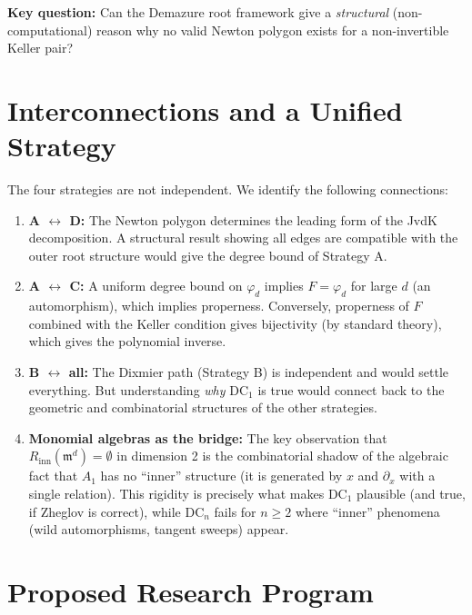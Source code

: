 \documentclass[12pt,a4paper]{article}
\theoremstyle{definition}
\newcommand{\pp}{\mathfrak{m}}
\begin{document}
\textbf{Key question:} Can the Demazure root framework give a \emph{structural}
(non-computational) reason why no valid Newton polygon exists for a non-invertible
Keller pair?

\section{Interconnections and a Unified Strategy}

The four strategies are not independent. We identify the following connections:

\begin{enumerate}
\item \textbf{A $\leftrightarrow$ D:} The Newton polygon determines the leading form
  of the JvdK decomposition. A structural result showing all edges are compatible with
  the outer root structure would give the degree bound of Strategy A.

\item \textbf{A $\leftrightarrow$ C:} A uniform degree bound on $\varphi_d$ implies
  $F = \varphi_d$ for large $d$ (an automorphism), which implies properness.
  Conversely, properness of $F$ combined with the Keller condition gives bijectivity
  (by standard theory), which gives the polynomial inverse.

\item \textbf{B $\leftrightarrow$ all:} The Dixmier path (Strategy B) is independent
  and would settle everything. But understanding \emph{why} DC$_1$ is true would connect
  back to the geometric and combinatorial structures of the other strategies.

\item \textbf{Monomial algebras as the bridge:} The key observation that $R_{\mathrm{inn}}(\pp^d)
  = \emptyset$ in dimension 2 is the combinatorial shadow of the algebraic fact that
  $A_1$ has no ``inner'' structure (it is generated by $x$ and $\partial_x$ with a
  single relation). This rigidity is precisely what makes DC$_1$ plausible (and true,
  if Zheglov is correct), while DC$_n$ fails for $n \geq 2$ where ``inner'' phenomena
  (wild automorphisms, tangent sweeps) appear.
\end{enumerate}

\section{Proposed Research Program}
\end{document}
